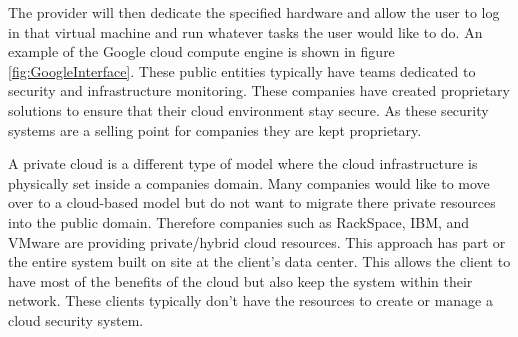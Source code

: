 \documentclass[12pt]{article}
\begin{document}
The provider will then dedicate the specified hardware and allow the user to log in that virtual machine and run whatever tasks the user would like to do. An example of the Google cloud compute engine is shown in figure \ref{fig:GoogleInterface}.  These public entities typically have teams dedicated to security and infrastructure monitoring. These companies have created proprietary solutions to ensure that their cloud environment \cite{SecAmazon} stay secure. As these security systems are a selling point for companies they are kept proprietary.

A private cloud is a different type of model where the cloud infrastructure is physically set inside a companies domain. Many companies would like to move over to a cloud-based model but do not want to migrate there private resources into the public domain. Therefore companies such as RackSpace, IBM, and VMware are providing private/hybrid cloud resources. This approach has part or the entire system built on site at the client's data center. This allows the client to have most of the benefits of the cloud but also keep the system within their network. These clients typically don't have the resources to create or manage a cloud security system.
\end{document}
